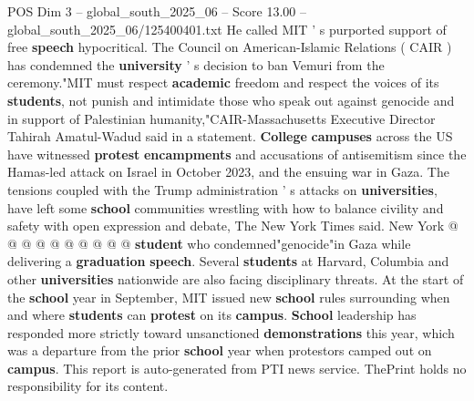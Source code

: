 \begin{textsample}{POS Dim 3 – global\_south\_2025\_06 – Score 13.00 – global\_south\_2025\_06/125400401.txt}
He called MIT ' s purported support of free \textbf{speech} hypocritical.
The Council on American-Islamic Relations ( CAIR ) has condemned the \textbf{university} ' s decision to ban Vemuri from the ceremony."MIT must respect \textbf{academic} freedom and respect the voices of its \textbf{students}, not punish and intimidate those who speak out against genocide and in support of Palestinian humanity,"CAIR-Massachusetts Executive Director Tahirah Amatul-Wadud said in a statement. \textbf{College} \textbf{campuses} across the US have witnessed \textbf{protest} \textbf{encampments} and accusations of antisemitism since the Hamas-led attack on Israel in October 2023, and the ensuing war in Gaza.
The tensions coupled with the Trump administration ' s attacks on \textbf{universities}, have left some \textbf{school} communities wrestling with how to balance civility and safety with open expression and debate, The New York Times said.
New York @ @ @ @ @ @ @ @ @ @ \textbf{student} who condemned"genocide"in Gaza while delivering a \textbf{graduation} \textbf{speech}.
Several \textbf{students} at Harvard, Columbia and other \textbf{universities} nationwide are also facing disciplinary threats.
At the start of the \textbf{school} year in September, MIT issued new \textbf{school} rules surrounding when and where \textbf{students} can \textbf{protest} on its \textbf{campus}. \textbf{School} leadership has responded more strictly toward unsanctioned \textbf{demonstrations} this year, which was a departure from the prior \textbf{school} year when protestors camped out on \textbf{campus}.
This report is auto-generated from PTI news service.
ThePrint holds no responsibility for its content.

\end{textsample}
